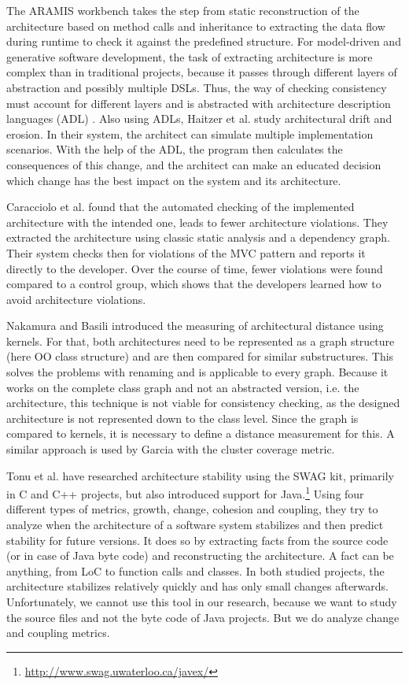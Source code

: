 \documentclass[sigplan, anonymous, review]{acmart}
\begin{document}
The ARAMIS workbench \cite{Aramis} takes the step from static reconstruction of the architecture based on method calls and inheritance to extracting the data flow during runtime to check it against the predefined structure. 
For model-driven and generative software development, the task of extracting architecture is more complex than in traditional projects, because it passes through different layers of abstraction and possibly multiple DSLs. 
Thus, the way of checking consistency must account for different layers and is abstracted with architecture description languages (ADL) \cite{ArcCons,Arc-MDSE}. 
Also using ADLs, Haitzer et al. \cite{Arc-Decision} study architectural drift and erosion. In their system, the architect can simulate multiple implementation scenarios. With the help of the ADL, the program then calculates the consequences of this change, and the architect can make an educated decision which change has the best impact on the system and its architecture. 

Caracciolo et al. \cite{ArcConf} found that the automated checking of the implemented architecture with the intended one, leads to fewer architecture violations. They extracted the architecture using classic static analysis and a dependency graph. Their system checks then for violations of the MVC pattern and reports it directly to the developer. Over the course of time, fewer violations were found compared to a control group, which shows that the developers learned how to avoid architecture violations.

Nakamura and Basili \cite{StructDist} introduced the measuring of architectural distance using kernels. For that, both architectures need to be represented as a graph structure (here OO class structure) and are then compared for similar substructures. This solves the problems with renaming and is applicable to every graph. 
Because it works on the complete class graph and not an abstracted version, i.e. the architecture, this technique is not viable for consistency checking, as the designed architecture is not represented down to the class level. 
Since the graph is compared to kernels, it is necessary to define a distance measurement for this. A similar approach is used by Garcia \cite{arcade-thesis} with the cluster coverage metric.

Tonu et al. \cite{Swag} have researched architecture stability using the SWAG kit, primarily in C and C++ projects, but also introduced support for Java.\footnote{\url{http://www.swag.uwaterloo.ca/javex/}} Using four different types of metrics, growth, change, cohesion and coupling, they try to analyze when the architecture of a software system stabilizes and then predict stability for future versions. It does so by extracting facts from the source code (or in case of Java byte code) and reconstructing the architecture. A fact can be anything, from LoC to function calls and classes. 
In both studied projects, the architecture stabilizes relatively quickly and has only small changes afterwards. Unfortunately, we cannot use this tool in our research, because we want to study the source files and not the byte code of Java projects. But we do analyze change and coupling metrics.
\end{document}
